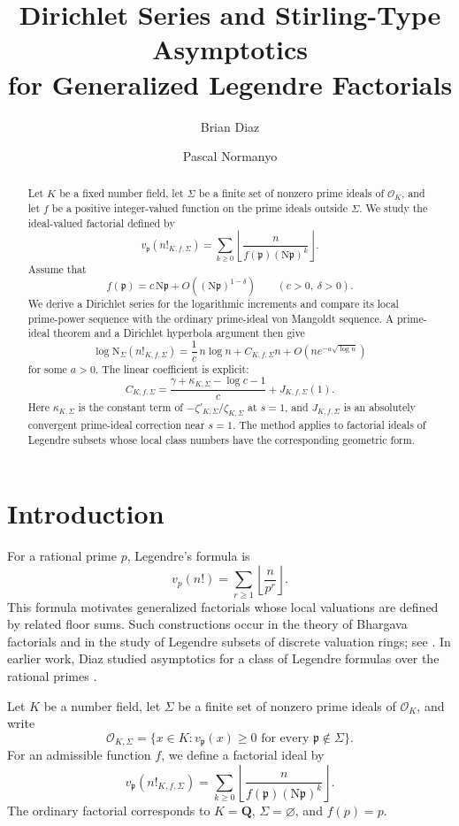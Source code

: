 \documentclass[11pt]{article}
\title{Dirichlet Series and Stirling-Type Asymptotics\\
for Generalized Legendre Factorials}
\author{Brian Diaz \and Pascal Normanyo}
\date{}
\newcommand{\OK}{\mathcal O_K}
\newcommand{\OKS}{\mathcal O_{K,\Sigma}}
\newcommand{\Norm}{\mathrm N}
\begin{document}
\maketitle

\begin{abstract}
Let \(K\) be a fixed number field, let \(\Sigma\) be a finite set of
nonzero prime ideals of \(\mathcal O_K\), and let \(f\) be a positive
integer-valued function on the prime ideals outside \(\Sigma\).
We study the ideal-valued factorial defined by
\[
v_{\mathfrak p}(n!_{K,f,\Sigma})
=
\sum_{k\ge 0}
\left\lfloor
\frac{n}{f(\mathfrak p)(\Norm\mathfrak p)^k}
\right\rfloor .
\]
Assume that
\[
f(\mathfrak p)
=
c\,\Norm\mathfrak p
+
O\!\left((\Norm\mathfrak p)^{1-\delta}\right)
\qquad (c>0,\ \delta>0).
\]
We derive a Dirichlet series for the logarithmic increments and compare
its local prime-power sequence with the ordinary prime-ideal von
Mangoldt sequence.  A prime-ideal theorem and a Dirichlet hyperbola
argument then give
\[
\log \Norm_\Sigma(n!_{K,f,\Sigma})
=
\frac1c\,n\log n
+
C_{K,f,\Sigma}n
+
O\!\left(
n e^{-a\sqrt{\log n}}
\right)
\]
for some \(a>0\).  The linear coefficient is explicit:
\[
C_{K,f,\Sigma}
=
\frac{\gamma+\kappa_{K,\Sigma}-\log c-1}{c}
+
J_{K,f,\Sigma}(1).
\]
Here \(\kappa_{K,\Sigma}\) is the constant term of
\(-\zeta'_{K,\Sigma}/\zeta_{K,\Sigma}\) at \(s=1\), and
\(J_{K,f,\Sigma}\) is an absolutely convergent prime-ideal correction
near \(s=1\).  The method applies to factorial ideals of Legendre
subsets whose local class numbers have the corresponding geometric
form.
\end{abstract}

\section{Introduction}

For a rational prime \(p\), Legendre's formula is
\[
v_p(n!)
=
\sum_{r\ge 1}
\left\lfloor\frac{n}{p^r}\right\rfloor.
\]
This formula motivates generalized factorials whose local valuations
are defined by related floor sums.  Such constructions occur in the
theory of Bhargava factorials and in the study of Legendre subsets of
discrete valuation rings; see \cite{Bhargava,EvrardFares}.  In earlier
work, Diaz studied asymptotics for a class of Legendre formulas over
the rational primes \cite{DiazLegendre}.

Let \(K\) be a number field, let \(\Sigma\) be a finite set of nonzero
prime ideals of \(\OK\), and write
\[
\OKS
=
\{x\in K:
v_{\mathfrak p}(x)\ge 0
\text{ for every }\mathfrak p\notin\Sigma\}.
\]
For an admissible function \(f\), we define a factorial ideal by
\[
v_{\mathfrak p}(n!_{K,f,\Sigma})
=
\sum_{k\ge 0}
\left\lfloor
\frac{n}{f(\mathfrak p)(\Norm\mathfrak p)^k}
\right\rfloor .
\]
The ordinary factorial corresponds to
\(K=\mathbf Q\), \(\Sigma=\varnothing\), and \(f(p)=p\).
\end{document}
